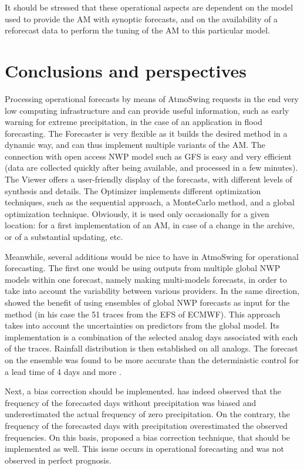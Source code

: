 \documentclass[review]{elsarticle}
\begin{document}
It should be stressed that these operational aspects are dependent on the model used to provide the AM with synoptic forecasts, and on the availability of a reforecast data to perform the tuning of the AM to this particular model.


\section{Conclusions and perspectives}

Processing operational forecasts by means of AtmoSwing requests in the end very low computing infrastructure and can provide useful information, such as early warning for extreme precipitation, in the case of an application in flood forecasting. The Forecaster is very flexible as it builds the desired method in a dynamic way, and can thus implement multiple variants of the AM. The connection with open access NWP model such as GFS is easy and very efficient (data are collected quickly after being available, and processed in a few minutes). The Viewer offers a user-friendly display of the forecasts, with different levels of synthesis and details. The Optimizer implements different optimization techniques, such as the sequential approach, a Monte\textendash Carlo method, and a global optimization technique. Obviously, it is used only occasionally for a given location: for a first implementation of an AM, in case of a change in the archive, or of a substantial updating, etc.

Meanwhile, several additions would be nice to have in AtmoSwing for operational forecasting. The first one would be using outputs from multiple global NWP models within one forecast, namely making multi-models forecasts, in order to take into account the variability between various providers. In the same direction, \citet{Thevenot2004} showed the benefit of using ensembles of global NWP forecasts as input for the method (in his case the 51 traces from the EFS of ECMWF). This approach takes into account the uncertainties on predictors from the global model. Its implementation is a combination of the selected analog days associated with each of the traces. Rainfall distribution is then established on all analogs. The forecast on the ensemble was found to be more accurate than the deterministic control for a lead time of 4 days and more \citep{Thevenot2004}. 

Next, a bias correction should be implemented. \citet{Marty2010} has indeed observed that the frequency of the forecasted days without precipitation was biased and underestimated the actual frequency of zero precipitation. On the contrary, the frequency of the forecasted days with precipitation overestimated the observed frequencies. On this basis, \citet{Marty2010} proposed a bias correction technique, that should be implemented as well. This issue occurs in operational forecasting and was not observed in perfect prognosis.
\end{document}
